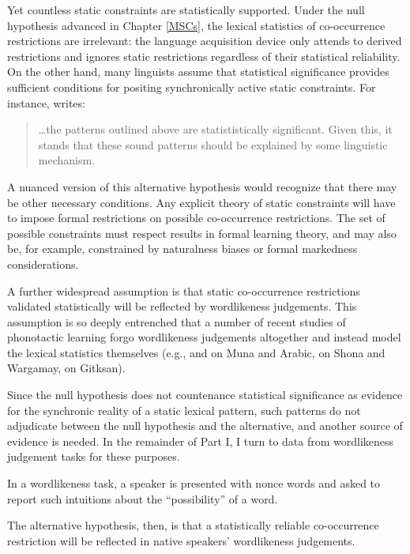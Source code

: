 Yet countless static constraints are statistically supported. Under the null hypothesis advanced in Chapter \ref{MSCs}, the lexical statistics of co-occurrence restrictions are irrelevant: the language acquisition device only attends to derived restrictions and ignores static restrictions regardless of their statistical reliability. On the other hand, many linguists assume that statistical significance provides sufficient conditions for positing synchronically active static constraints. For instance, \citet{Brown2010} writes:

\begin{quotation}
\ldots the patterns outlined above are statististically significant. Given this, it stands that these sound patterns should be explained by some linguistic mechanism. \citep[][48]{Brown2010}
\end{quotation}

\noindent
A nuanced version of this alternative hypothesis would recognize that there may be other necessary conditions. Any explicit theory of static constraints will have to impose formal restrictions on possible co-occurrence restrictions. The set of possible constraints must respect results in formal learning theory, and may also be, for example, constrained by naturalness biases or formal markedness considerations. 

A further widespread assumption is that static co-occurrence restrictions validated statistically will be reflected by wordlikeness judgements. This assumption is so deeply entrenched that a number of recent studies of phonotactic learning forgo wordlikeness judgements altogether and instead model the lexical statistics themselves (e.g., \citealt{Coetzee2008a} and \citealt{Anttila2008} on Muna and Arabic, \citealt[][385]{Hayes2008a} on Shona and Wargamay, \citealt{Brown2010} on Gitksan). 

Since the null hypothesis does not countenance statistical significance as evidence for the synchronic reality of a static lexical pattern, such patterns do not adjudicate between the null hypothesis and the alternative, and another source of evidence is needed. In the remainder of Part I, I turn to data from wordlikeness judgement tasks for these purposes. 

In a wordlikeness task, a speaker is presented with nonce words and asked to report such intuitions about the ``possibility'' of a word. 



The alternative hypothesis, then, is that a statistically reliable co-occurrence restriction will be reflected in native speakers' wordlikeness judgements. 

